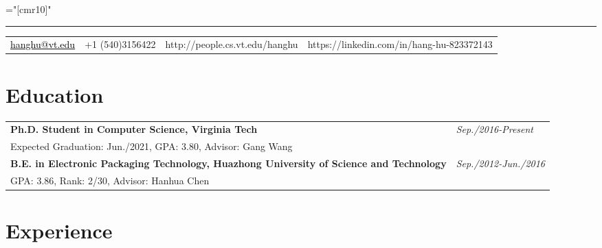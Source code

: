 \documentclass[a4paper,10pt]{article}
\begin{document}
\pagestyle{empty} %

\font\fb="[cmr10]" %

\bigskip

\hrule height 0.7mm \vspace{-0.4em}
\begin{tabular}{lp{2cm}p{4.5cm}p{8cm}}
{\small \href{mailto:hanghu@vt.edu}{\textcolor{black}{hanghu@vt.edu}}}
&{\small +1 (540)3156422}
&{\small http://people.cs.vt.edu/hanghu}
&{\small https://linkedin.com/in/hang-hu-823372143}
   \\
\end{tabular}
\section{Education}

\vspace{-0.2cm}

\begin{tabular}{p{15cm}p{3cm}}
\textbf{Ph.D. Student in Computer Science, Virginia Tech} & \emph{Sep./2016-Present} \\
\hspace{1em} Expected Graduation: Jun./2021, GPA: 3.80, Advisor: Gang Wang\\
\textbf{B.E. in Electronic Packaging Technology, Huazhong University of Science and Technology} & \emph{Sep./2012-Jun./2016} \\
\hspace{1em} GPA: 3.86, Rank: 2/30, Advisor: Hanhua Chen
\end{tabular}

\vspace{-0.3cm}

\section{Experience}

\vspace{-0.2cm}
\end{document}
